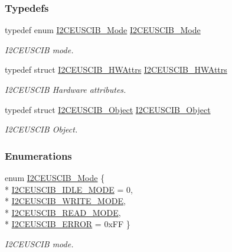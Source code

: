 \subsubsection*{Typedefs}
\begin{DoxyCompactItemize}
\item 
typedef enum \hyperlink{_i2_c_e_u_s_c_i_b_8h_a340ba5aa9e4c5a5a8d139aa77d40f63d}{I2\+C\+E\+U\+S\+C\+I\+B\+\_\+\+Mode} \hyperlink{_i2_c_e_u_s_c_i_b_8h_ab14ed18de4d94a4f4dd02b069949e331}{I2\+C\+E\+U\+S\+C\+I\+B\+\_\+\+Mode}
\begin{DoxyCompactList}\small\item\em I2\+C\+E\+U\+S\+C\+I\+B mode. \end{DoxyCompactList}\item 
typedef struct \hyperlink{struct_i2_c_e_u_s_c_i_b___h_w_attrs}{I2\+C\+E\+U\+S\+C\+I\+B\+\_\+\+H\+W\+Attrs} \hyperlink{_i2_c_e_u_s_c_i_b_8h_ac186518a479ed39f3b2938dc44a72be5}{I2\+C\+E\+U\+S\+C\+I\+B\+\_\+\+H\+W\+Attrs}
\begin{DoxyCompactList}\small\item\em I2\+C\+E\+U\+S\+C\+I\+B Hardware attributes. \end{DoxyCompactList}\item 
typedef struct \hyperlink{struct_i2_c_e_u_s_c_i_b___object}{I2\+C\+E\+U\+S\+C\+I\+B\+\_\+\+Object} \hyperlink{_i2_c_e_u_s_c_i_b_8h_ae6882d1e8a8d4484a9a78d60f02fbe4c}{I2\+C\+E\+U\+S\+C\+I\+B\+\_\+\+Object}
\begin{DoxyCompactList}\small\item\em I2\+C\+E\+U\+S\+C\+I\+B Object. \end{DoxyCompactList}\end{DoxyCompactItemize}
\subsubsection*{Enumerations}
\begin{DoxyCompactItemize}
\item 
enum \hyperlink{_i2_c_e_u_s_c_i_b_8h_a340ba5aa9e4c5a5a8d139aa77d40f63d}{I2\+C\+E\+U\+S\+C\+I\+B\+\_\+\+Mode} \{ \\*
\hyperlink{_i2_c_e_u_s_c_i_b_8h_a340ba5aa9e4c5a5a8d139aa77d40f63da8744edbd0669ab61ff8c411019f43c57}{I2\+C\+E\+U\+S\+C\+I\+B\+\_\+\+I\+D\+L\+E\+\_\+\+M\+O\+D\+E} = 0, 
\\*
\hyperlink{_i2_c_e_u_s_c_i_b_8h_a340ba5aa9e4c5a5a8d139aa77d40f63daa203253d5fec9afc395ae05d57569a4a}{I2\+C\+E\+U\+S\+C\+I\+B\+\_\+\+W\+R\+I\+T\+E\+\_\+\+M\+O\+D\+E}, 
\\*
\hyperlink{_i2_c_e_u_s_c_i_b_8h_a340ba5aa9e4c5a5a8d139aa77d40f63da1bf077190915c1011af702b3f2347426}{I2\+C\+E\+U\+S\+C\+I\+B\+\_\+\+R\+E\+A\+D\+\_\+\+M\+O\+D\+E}, 
\\*
\hyperlink{_i2_c_e_u_s_c_i_b_8h_a340ba5aa9e4c5a5a8d139aa77d40f63da692bdcc2af508c2c749b03a702e0c36d}{I2\+C\+E\+U\+S\+C\+I\+B\+\_\+\+E\+R\+R\+O\+R} = 0x\+F\+F
 \}
\begin{DoxyCompactList}\small\item\em I2\+C\+E\+U\+S\+C\+I\+B mode. \end{DoxyCompactList}\end{DoxyCompactItemize}
